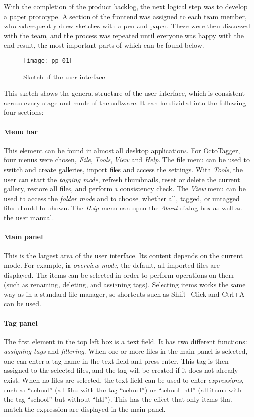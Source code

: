 With the completion of the product backlog, the next logical step was to
develop a paper prototype. A section of the frontend was assigned to each team
member, who subsequently drew sketches with a pen and paper. These were then
discussed with the team, and the process was repeated until everyone was happy
with the end result, the most important parts of which can be found below.

\begin{figure}
	\centering
	\texttt{[image: pp\_01]}
	\caption{Sketch of the user interface}
\end{figure}

This sketch shows the general structure of the user interface, which is
consistent across every stage and mode of the software. It can be divided into
the following four sections:

\paragraph{Menu bar} This element can be found in almost all desktop
applications. For OctoTagger, four menus were chosen, \emph{File},
\emph{Tools}, \emph{View} and \emph{Help}. The file menu can be used to switch
and create galleries, import files and access the settings. With \emph{Tools}, the
user can start the \emph{tagging mode}, refresh thumbnails, reset or delete the
current gallery, restore all files, and perform a consistency check.  The \emph{View}
menu can be used to access the \emph{folder mode} and to choose, whether all,
tagged, or untagged files should be shown. The \emph{Help} menu can open the \emph{About}
dialog box as well as the user manual.

\paragraph{Main panel} This is the largest area of the user interface. Its content
depends on the current mode. For example, in \emph{overview mode}, the default,
all imported files are displayed. The items can be selected in order to perform
operations on them (such as renaming, deleting, and assigning tags). Selecting
items works the same way as in a standard file manager, so shortcuts
such as Shift+Click and Ctrl+A can be used. %

\paragraph{Tag panel} The first element in the top left box is a text field. It
has two different functions: \emph{assigning tags} and \emph{filtering}.  When
one or more files in the main panel is selected, one can enter a tag name in
the text field and press enter. This tag is then assigned to the selected
files, and the tag will be created if it does not already exist. When no files
are selected, the text field can be used to enter \emph{expressions}, such as
``school'' (all files with the tag ``school'') or ``school -htl'' (all items
with the tag ``school'' but without ``htl''). This has the effect that only
items that match the expression are displayed in the main panel.

